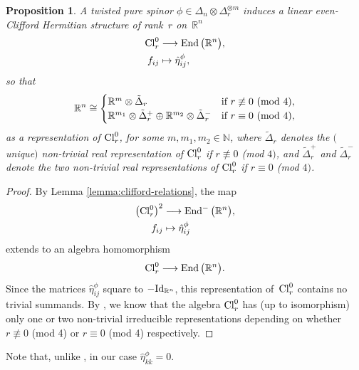 \documentclass[10pt,a4paper]{amsart}
\newcommand{\lra}{\longrightarrow}
\numberwithin{equation}{section}
\newtheorem{Proposition}[Theorem]{Proposition}
 { \theoremstyle{definition}
\newtheorem{Definition}[Theorem]{Definition}
\newtheorem{Remark}[Theorem]{Remark}
\newtheorem{Example}[Theorem]{Example}
}
\begin{document}
\begin{Proposition}\label{prop: Clifford transfer} A twisted pure spinor $\phi\in\Delta_n\otimes\Delta_r^{\otimes m}$ induces a linear even-Clifford Hermitian structure
of rank~$r$ on~$\mathbb{R}^n$
\begin{align*}
{\rm Cl}_r^0&\lra \operatorname{End}\big(\mathbb{R}^n\big), \\
f_{ij}&\mapsto \hat\eta_{ij}^\phi,
 \end{align*}
so that
\begin{gather*}\mathbb{R}^n \cong
\begin{cases}
\mathbb{R}^m\otimes \tilde\Delta_r & \text{if $r\not\equiv 0$ {\rm (mod 4)}},\\
\mathbb{R}^{m_1}\otimes\tilde\Delta_r^+ \oplus \mathbb{R}^{m_2}\otimes\tilde\Delta_r^- &
\text{if $r\equiv 0$ {\rm (mod 4)}},\end{cases}
\end{gather*}
as a representation of ${\rm Cl}_r^0$, for some $m, m_1, m_2\in\mathbb{N}$, where $\tilde\Delta_r$ denotes the $($unique$)$ non-trivial real representation of ${\rm Cl}_r^0$ if $r\not\equiv 0$ {\rm (mod} $4)$, and $\tilde\Delta_r^+$ and $\tilde\Delta_r^-$ denote the two non-trivial real representations of ${\rm Cl}_r^0$ if $r\equiv 0$ {\rm (mod} $4)$.
\end{Proposition}
\begin{proof} By Lemma \ref{lemma:clifford-relations}, the map
\begin{align*}
\big({\rm Cl}_r^0\big)^2&\lra \operatorname{End}^-\big(\mathbb{R}^n\big),\\
f_{ij} &\mapsto \hat\eta_{ij}^\phi
\end{align*}
extends to an algebra homomorphism
\begin{gather*}
{\rm Cl}_r^0 \lra \operatorname{End}\big(\mathbb{R}^n\big).
\end{gather*}
Since the matrices $\hat\eta_{ij}^\phi$ square to $-{\rm Id}_{\mathbb{R}^n}$, this representation of~${\rm Cl}_r^0$ contains no trivial summands. By \cite[Theorem~5.6]{Lawson}, we know that the algebra ${\rm Cl}_r^0$ has (up to isomorphism) only one or two non-trivial irreducible representations depending on whether $r\not\equiv 0$ ({\rm mod} 4) or $r\equiv 0$ ({\rm mod} 4) respectively.
\end{proof}

\begin{Remark} Note that, unlike \cite{Moroianu-Semmelmann}, in our case $\hat\eta_{kk}^\phi=0$.\end{Remark}
\end{document}
